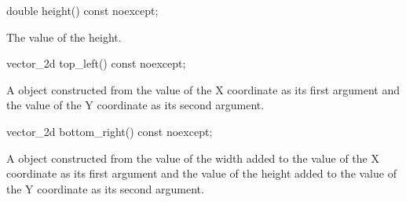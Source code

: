 \begin{itemdecl}
double height() const noexcept;
\end{itemdecl}
\begin{itemdescr}
	\pnum
	\returns
	The value of the height.
\end{itemdescr}

\begin{itemdecl}
vector_2d top_left() const noexcept;
\end{itemdecl}
\begin{itemdescr}
	\pnum
	\returns
	A  object constructed from the value of the X coordinate as its first argument and the value of the Y coordinate as its second argument.
\end{itemdescr}

\begin{itemdecl}
vector_2d bottom_right() const noexcept;
\end{itemdecl}
\begin{itemdescr}
	\pnum
	\returns
	A  object constructed from the value of the width added to the value of the X coordinate as its first argument and the value of the height added to the value of the Y coordinate as its second argument.
\end{itemdescr}
